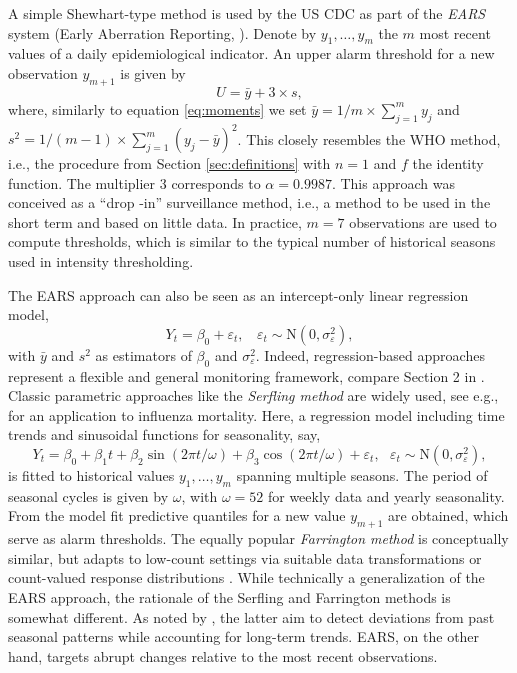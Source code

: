 \documentclass[12pt]{article}
\begin{document}
A simple Shewhart-type method is used by the US CDC as part of the \textit{EARS} system (Early Aberration Reporting, \citealt{Hutwagner2003}). Denote by $y_1, \dots, y_m$ the $m$ most recent values of a daily epidemiological indicator. An upper alarm threshold for a new observation $y_{m + 1}$ is given by
$$
U = \bar{y} + 3 \times s,
$$ 
where, similarly to equation \eqref{eq:moments} we set $\bar{y} = 1/m \times \sum_{j = 1}^m y_j$ and $s^2 = 1/(m - 1) \times \sum_{j = 1}^m (y_j - \bar{y})^2$. This closely resembles the WHO method, i.e., the procedure from Section \ref{sec:definitions} with $n = 1$ and $f$ the identity function. The multiplier 3 corresponds to $\alpha = 0.9987$. This approach was conceived as a ``drop -in'' surveillance method, i.e., a method to be used in the short term and based on little data. In practice, $m = 7$ observations are used to compute thresholds, which is similar to the typical number of historical seasons used in intensity thresholding.

The EARS approach can also be seen as an intercept-only linear regression model,
$$
Y_{t} = \beta_0 + \varepsilon_{t}, \ \ \ \ \varepsilon_t \sim \text{N}(0, \sigma_\varepsilon^2),
$$
with $\bar{y}$ and $s^2$ as estimators of $\beta_0$ and $\sigma_\varepsilon^2$. Indeed, regression-based approaches represent a flexible and general monitoring framework, compare Section 2 in \cite{Unkel2012}. Classic parametric approaches like the \textit{Serfling method} \citep{Serfling1896} are widely used, see e.g., \cite{Thompson2009} for an application to influenza mortality. Here, a regression model including time trends and sinusoidal functions for seasonality, say,
\begin{equation}
Y_{t} = \beta_0 + \beta_1 t + \beta_2 \sin(2\pi t / \omega) + \beta_3 \cos(2\pi t / \omega) + \varepsilon_t, \ \ \ \varepsilon_t \sim \text{N}(0, \sigma_\varepsilon^2),
\label{eq:serfling}
\end{equation}
is fitted to historical values $y_1, \dots, y_m$ spanning multiple seasons. The period of seasonal cycles is given by $\omega$, with $\omega = 52$ for weekly data and yearly seasonality. From the model fit predictive quantiles for a new value $y_{m + 1}$ are obtained, which serve as alarm thresholds. The equally popular \textit{Farrington method} is conceptually similar, but adapts to low-count settings via suitable data transformations \citep{Farrington1996} or count-valued response distributions \citep{Noufaily2013}. While technically a generalization of the EARS approach, the rationale of the Serfling and Farrington methods is somewhat different. As noted by \cite{Hutwagner2003}, the latter aim to detect deviations from past seasonal patterns while accounting for long-term trends. EARS, on the other hand, targets abrupt changes relative to the most recent observations.
\end{document}
